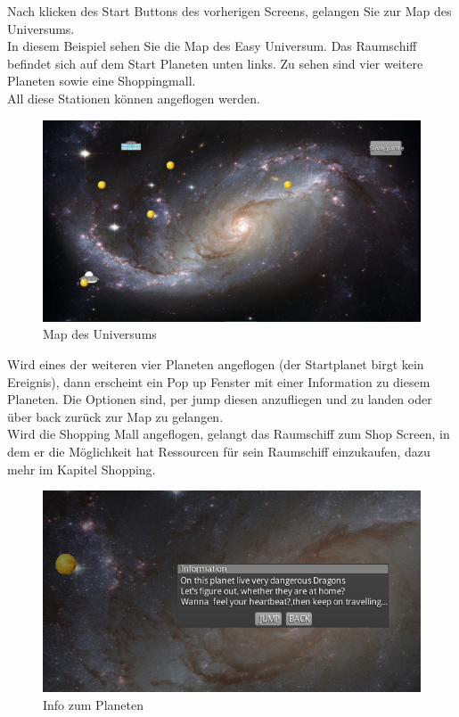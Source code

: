 \documentclass[fontsize=12pt,paper=a4,twoside]{scrartcl}
\begin{document}
Nach klicken des Start Buttons des vorherigen Screens, gelangen Sie zur Map des Universums.\\
In diesem Beispiel sehen Sie die Map des Easy Universum. Das Raumschiff befindet sich auf dem Start Planeten unten links. Zu sehen sind vier weitere Planeten sowie eine Shoppingmall.\\
All diese Stationen können angeflogen werden.
\begin{figure}[htp]
	\centering
	\includegraphics[width=1.00\linewidth]{pics/universeEasyP1.png}
	\caption{Map des Universums}
	\label{fig1}
\end{figure}

Wird eines der weiteren vier Planeten angeflogen (der Startplanet birgt kein Ereignis), dann erscheint ein
Pop up Fenster mit einer Information zu diesem Planeten. Die Optionen sind, per jump diesen anzufliegen und zu landen oder über back zurück zur Map zu gelangen.\\
Wird die Shopping Mall angeflogen, gelangt das Raumschiff zum Shop Screen, in dem er die Möglichkeit hat Ressourcen für sein Raumschiff einzukaufen, dazu mehr im Kapitel Shopping.\\

\begin{figure}[htp]
	\centering
	\includegraphics[width=1.00\linewidth]{pics/infoPlanet2.png} %
	\caption{Info zum Planeten}
	\label{fig1}
\end{figure}
\end{document}

